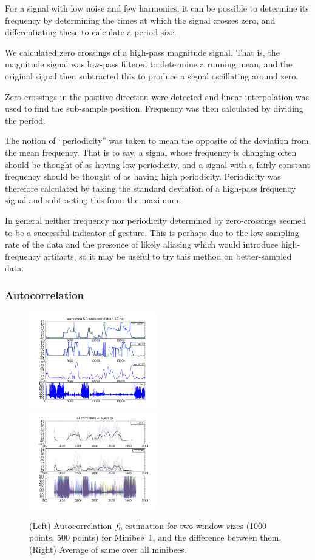 \documentclass{article}
\begin{document}
For a signal with low noise and few harmonics, it can be possible to
determine its frequency by determining the times at which the signal
crosses zero, and differentiating these to calculate a period size.

We calculated zero crossings of a high-pass magnitude signal.  That
is, the magnitude signal was low-pass filtered to determine a running
mean, and the original signal then subtracted this to produce a signal
oscillating around zero.

Zero-crossings in the positive direction were detected and linear
interpolation was used to find the sub-sample position.
Frequency was then calculated by dividing the period.

The notion of ``periodicity'' was taken to mean the opposite of the
deviation from the mean frequency.
That is to say, a signal whose frequency is changing often should be
thought of as having low periodicity, and a signal with a fairly
constant frequency should be thought of as having high periodicity.
Periodicity was therefore calculated by taking the standard deviation
of a high-pass frequency signal and subtracting this from the maximum.

In general neither frequency nor periodicity determined by
zero-crossings seemed to be a successful indicator of gesture.
This is perhaps due to the low sampling rate of the data and the
presence of likely aliasing which would introduce high-frequency
artifacts, so it may be useful to try this method on better-sampled
data.

\subsubsection{Autocorrelation}

\begin{figure}
\includegraphics[width=0.5\textwidth]{images/workshop_autocorr_10hz_m1.png}
\includegraphics[width=0.5\textwidth]{images/workshop_all_autocorr_f0_10hz.png}
\caption{(Left) Autocorrelation $f_0$ estimation for two window sizes
  (1000 points, 500 points) for Minibee~1, and the difference between
  them.  (Right) Average of same over all minibees.}
\label{autof0}
\end{figure}
\end{document}
